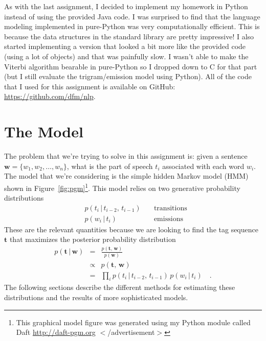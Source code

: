 \documentclass[11pt]{article}
\newcommand{\fig}[1]{Figure~\ref{fig:#1}}
\newcommand{\bvec}[1]{\ensuremath{\boldsymbol{#1}}}
\begin{document}
As with the last assignment, I decided to implement my homework in Python
instead of using the provided Java code.
I was surprised to find that the language modeling implemented in pure-Python
was very computationally efficient.
This is because the data structures in the standard library are pretty
impressive!
I also started implementing a version that looked a bit more like the provided
code (using a lot of objects) and that was painfully slow.
I wasn't able to make the Viterbi algorithm bearable in pure-Python so I
dropped down to C for that part (but I still evaluate the trigram/emission
model using Python).
All of the code that I used for this assignment is available on GitHub:
\url{https://github.com/dfm/nlp}.

\section{The Model}

The problem that we're trying to solve in this assignment is: given a
sentence $\bvec{w} = \{w_1, w_2, \ldots, w_n\}$, what is the part of
speech $t_i$ associated with each word $w_i$.
The model that we're considering is the simple hidden Markov model (HMM) shown
in \fig{pgm}\footnote{This graphical model figure was generated using my
Python module called Daft \url{http://daft-pgm.org} $<$/advertisement$>$}.
This model relies on two generative probability distributions
\begin{eqnarray}
& p(t_i \,|\, t_{i-2},\,t_{i-1}) & \quad \mathrm{transitions} \\
& p(w_i \,|\, t_i) & \quad \mathrm{emissions}
\end{eqnarray}
These are the relevant quantities because we are looking to find the tag
sequence $\bvec{t}$ that maximizes the posterior probability distribution
\begin{eqnarray}
p(\bvec{t}\,|\,\bvec{w}) &=& \frac{p(\bvec{t},\,\bvec{w})}{p(\bvec{w})}
                             \nonumber\\
                         &\propto& p(\bvec{t},\,\bvec{w}) \nonumber\\
                         &=& \prod_i p(t_i \,|\, t_{i-2},\,t_{i-1}) \,
                                     p(w_i \,|\, t_i) \quad.
\end{eqnarray}
The following sections describe the different methods for estimating these
distributions and the results of more sophisticated models.
\end{document}
